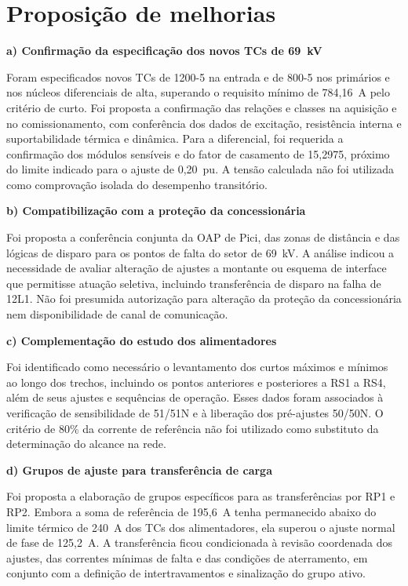 \newpage
\section{\textbf{Proposição de melhorias}}

\textbf{a) Confirmação da especificação dos novos TCs de 69~kV}

Foram especificados novos TCs de 1200-5 na entrada e de 800-5 nos primários e nos núcleos diferenciais de alta, superando o requisito mínimo de 784,16~A pelo critério de curto. Foi proposta a confirmação das relações e classes na aquisição e no comissionamento, com conferência dos dados de excitação, resistência interna e suportabilidade térmica e dinâmica. Para a diferencial, foi requerida a confirmação dos módulos sensíveis e do fator de casamento de 15,2975, próximo do limite indicado para o ajuste de 0,20~pu. A tensão calculada não foi utilizada como comprovação isolada do desempenho transitório.

\textbf{b) Compatibilização com a proteção da concessionária}

Foi proposta a conferência conjunta da OAP de Pici, das zonas de distância e das lógicas de disparo para os pontos de falta do setor de 69~kV. A análise indicou a necessidade de avaliar alteração de ajustes a montante ou esquema de interface que permitisse atuação seletiva, incluindo transferência de disparo na falha de 12L1. Não foi presumida autorização para alteração da proteção da concessionária nem disponibilidade de canal de comunicação.

\textbf{c) Complementação do estudo dos alimentadores}

Foi identificado como necessário o levantamento dos curtos máximos e mínimos ao longo dos trechos, incluindo os pontos anteriores e posteriores a RS1 a RS4, além de seus ajustes e sequências de operação. Esses dados foram associados à verificação de sensibilidade de 51/51N e à liberação dos pré-ajustes 50/50N. O critério de 80\% da corrente de referência não foi utilizado como substituto da determinação do alcance na rede.

\textbf{d) Grupos de ajuste para transferência de carga}

Foi proposta a elaboração de grupos específicos para as transferências por RP1 e RP2. Embora a soma de referência de 195,6~A tenha permanecido abaixo do limite térmico de 240~A dos TCs dos alimentadores, ela superou o ajuste normal de fase de 125,2~A. A transferência ficou condicionada à revisão coordenada dos ajustes, das correntes mínimas de falta e das condições de aterramento, em conjunto com a definição de intertravamentos e sinalização do grupo ativo.

